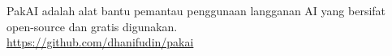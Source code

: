 \documentclass[12pt,a4paper]{book}
\begin{document}
\thispagestyle{empty}
\vspace*{\fill}
\begin{center}
  \small
  PakAI adalah alat bantu pemantau penggunaan langganan AI yang bersifat \\
  open-source dan gratis digunakan.\\[1em]
  \url{https://github.com/dhanifudin/pakai}
\end{center}
\vspace*{\fill}

\tableofcontents
\clearpage

\mainmatter











\backmatter
\end{document}
